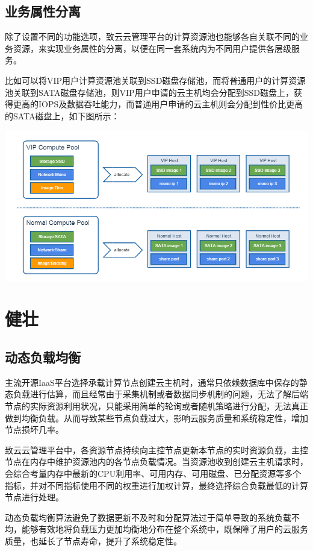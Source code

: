 \documentclass[letterpaper,10pt]{sphinxmanual}
\begin{document}
\section{业务属性分离}
\label{index:id16}
除了设置不同的功能选项，致云云管理平台的计算资源池也能够各自关联不同的业务资源，来实现业务属性的分离，以便在同一套系统内为不同用户提供各层级服务。

比如可以将VIP用户计算资源池关联到SSD磁盘存储池，而将普通用户的计算资源池关联到SATA磁盘存储池，则VIP用户申请的云主机均会分配到SSD磁盘上，获得更高的IOPS及数据吞吐能力，而普通用户申请的云主机则会分配到性价比更高的SATA磁盘上，如下图所示：

\includegraphics{3_4_compute_pool_property.png}


\chapter{健壮}
\label{index:id17}

\section{动态负载均衡}
\label{index:id18}
主流开源IaaS平台选择承载计算节点创建云主机时，通常只依赖数据库中保存的静态负载进行估算，而且经常由于采集机制或者数据同步机制的问题，无法了解后端节点的实际资源利用状况，只能采用简单的轮询或者随机策略进行分配，无法真正做到均衡负载。从而导致某些节点负载过大，影响云服务质量和系统稳定性，增加节点损坏几率。

致云云管理平台中，各资源节点持续向主控节点更新本节点的实时资源负载，主控节点在内存中维护资源池内的各节点负载情况。当资源池收到创建云主机请求时，会综合考量内存中最新的CPU利用率、可用内存、可用磁盘、已分配资源等多个指标，并对不同指标使用不同的权重进行加权计算，最终选择综合负载最低的计算节点进行处理。

动态负载均衡算法避免了数据更新不及时和分配算法过于简单导致的系统负载不均，能够有效地将负载压力更加均衡地分布在整个系统中，既保障了用户的云服务质量，也延长了节点寿命，提升了系统稳定性。
\end{document}
